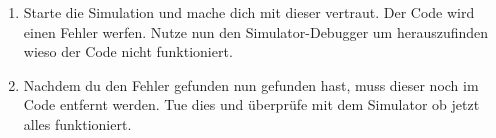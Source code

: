 
\begin{enumerate}
    \item Starte die Simulation und mache dich mit dieser vertraut. Der Code wird einen Fehler werfen. Nutze nun den Simulator-Debugger um herauszufinden wieso der Code nicht funktioniert.
    \item Nachdem du den Fehler gefunden nun gefunden hast, muss dieser noch im Code entfernt werden. Tue dies und überprüfe mit dem Simulator ob jetzt alles funktioniert.
\end{enumerate}

